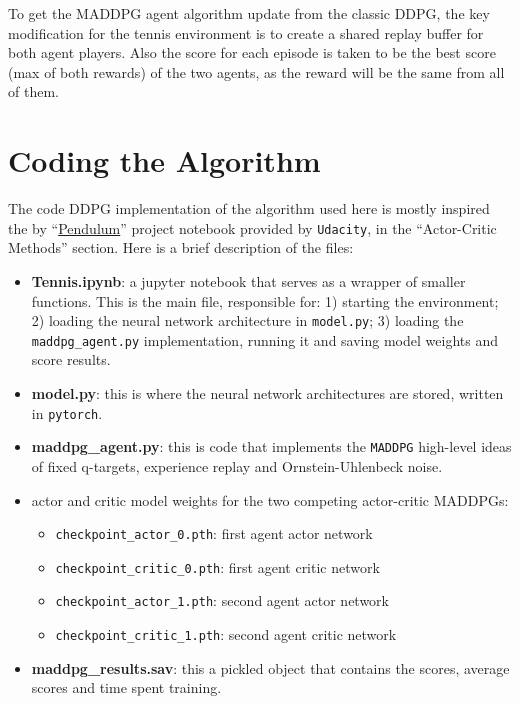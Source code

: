\documentclass[
]{article}
\providecommand{\tightlist}{%
  \setlength{\itemsep}{0pt}\setlength{\parskip}{0pt}}
\begin{document}
To get the MADDPG agent algorithm update from the classic DDPG, the key
modification for the tennis environment is to create a shared replay
buffer for both agent players. Also the score for each episode is taken
to be the best score (max of both rewards) of the two agents, as the
reward will be the same from all of them.

\hypertarget{coding-the-algorithm}{%
\section{Coding the Algorithm}\label{coding-the-algorithm}}

The code DDPG implementation of the algorithm used here is mostly
inspired the by
``\href{https://github.com/udacity/deep-reinforcement-learning/tree/master/ddpg-pendulum}{Pendulum}''
project notebook provided by \texttt{Udacity}, in the ``Actor-Critic
Methods'' section. Here is a brief description of the files:

\begin{itemize}
\item
  \textbf{Tennis.ipynb}: a jupyter notebook that serves as a wrapper of
  smaller functions. This is the main file, responsible for: 1) starting
  the environment; 2) loading the neural network architecture in
  \texttt{model.py}; 3) loading the \texttt{maddpg\_agent.py}
  implementation, running it and saving model weights and score results.
\item
  \textbf{model.py}: this is where the neural network architectures are
  stored, written in \texttt{pytorch}.
\item
  \textbf{maddpg\_agent.py}: this is code that implements the
  \texttt{MADDPG} high-level ideas of fixed q-targets, experience replay
  and Ornstein-Uhlenbeck noise.
\item
  actor and critic model weights for the two competing actor-critic
  MADDPGs:

  \begin{itemize}
  \tightlist
  \item
    \texttt{checkpoint\_actor\_0.pth}: first agent actor network
  \item
    \texttt{checkpoint\_critic\_0.pth}: first agent critic network
  \item
    \texttt{checkpoint\_actor\_1.pth}: second agent actor network
  \item
    \texttt{checkpoint\_critic\_1.pth}: second agent critic network
  \end{itemize}
\item
  \textbf{maddpg\_results.sav}: this a pickled object that contains the
  scores, average scores and time spent training.
\end{itemize}
\end{document}
